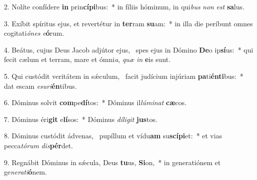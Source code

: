2. Nolíte confídere \textbf{in} prin\textbf{cí}\textbf{pi}bus:~*  in fíliis hóminum, in qui\textit{bus} \textit{non} \textit{est} \textbf{sa}lus.\

3. Exíbit spíritus ejus, et revertétur in \textbf{ter}ram \textbf{su}am:~*  in illa die períbunt omnes cogitati\textit{ó}\textit{nes} \textit{e}\textbf{ó}rum.\

4. Beátus, cujus Deus Jacob adjútor ejus, \dag\  spes ejus in Dómino \textbf{De}o ip\textbf{sí}us:~*  qui fecit cælum et terram, mare et ómni\textit{a}, \textit{quæ} \textit{in} \textbf{e}is sunt.\

5. Qui custódit veritátem in sǽculum, \dag\  facit judícium injúriam \textbf{pa}ti\textbf{én}\textbf{ti}bus:~*  dat escam \textit{e}\textit{su}\textit{ri}\textbf{én}tibus.\

6. Dóminus solvit \textbf{com}pe\textbf{dí}tos:~*  Dóminus il\textit{lú}\textit{mi}\textit{nat} \textbf{cæ}cos.\

7. Dóminus éri\textbf{git} e\textbf{lí}sos:~*  Dóminus \textit{dí}\textit{li}\textit{git} \textbf{jus}tos.\

8. Dóminus custódit ádvenas, \dag\  pupíllum et vídu\textbf{am} su\textbf{scí}\textbf{pi}et:~*  et vias pecca\textit{tó}\textit{rum} \textit{dis}\textbf{pér}det.\

9. Regnábit Dóminus in sǽcula, Deus \textbf{tu}us, \textbf{Si}on,~*  in generatiónem et ge\textit{ne}\textit{ra}\textit{ti}\textbf{ó}nem.\

